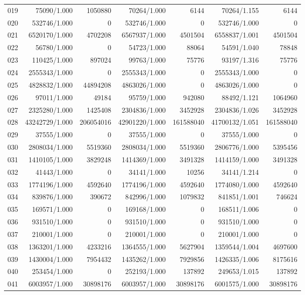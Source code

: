 \begin{longtable}{crrrrrr}
019 & 75090/1.000 & 1050880 & 70264/1.000 & 6144 & 70264/1.155 & 6144 \\
020 & 532746/1.000 & 0 & 532746/1.000 & 0 & 532746/1.000 & 0 \\
021 & 6520170/1.000 & 4702208 & 6567937/1.000 & 4501504 & 6558837/1.001 & 4501504 \\
022 & 56780/1.000 & 0 & 54723/1.000 & 88064 & 54591/1.040 & 78848 \\
023 & 110425/1.000 & 897024 & 99763/1.000 & 75776 & 93197/1.316 & 75776 \\
024 & 2555343/1.000 & 0 & 2555343/1.000 & 0 & 2555343/1.000 & 0 \\
025 & 4828832/1.000 & 44894208 & 4863026/1.000 & 0 & 4863026/1.000 & 0 \\
026 & 97011/1.000 & 49184 & 95759/1.000 & 942080 & 88492/1.121 & 1064960 \\
027 & 2325280/1.000 & 1425408 & 2304836/1.000 & 3452928 & 2304836/1.026 & 3452928 \\
028 & 43242729/1.000 & 206054016 & 42901220/1.000 & 161588040 & 41700132/1.051 & 161588040 \\
029 & 37555/1.000 & 0 & 37555/1.000 & 0 & 37555/1.000 & 0 \\
030 & 2808034/1.000 & 5519360 & 2808034/1.000 & 5519360 & 2806776/1.000 & 5395456 \\
031 & 1410105/1.000 & 3829248 & 1414369/1.000 & 3491328 & 1414159/1.000 & 3491328 \\
032 & 41443/1.000 & 0 & 34141/1.000 & 10256 & 34141/1.214 & 0 \\
033 & 1774196/1.000 & 4592640 & 1774196/1.000 & 4592640 & 1774080/1.000 & 4592640 \\
034 & 839876/1.000 & 390672 & 842996/1.000 & 1079832 & 841851/1.001 & 746624 \\
035 & 169571/1.000 & 0 & 169168/1.000 & 0 & 168511/1.006 & 0 \\
036 & 931510/1.000 & 0 & 931510/1.000 & 0 & 931510/1.000 & 0 \\
037 & 210001/1.000 & 0 & 210001/1.000 & 0 & 210001/1.000 & 0 \\
038 & 1363201/1.000 & 4233216 & 1364555/1.000 & 5627904 & 1359544/1.004 & 4697600 \\
039 & 1430004/1.000 & 7954432 & 1435262/1.000 & 7929856 & 1426335/1.006 & 8175616 \\
040 & 253454/1.000 & 0 & 252193/1.000 & 137892 & 249653/1.015 & 137892 \\
041 & 6003957/1.000 & 30898176 & 6003957/1.000 & 30898176 & 6001575/1.000 & 30898176 \\

\end{longtable}
